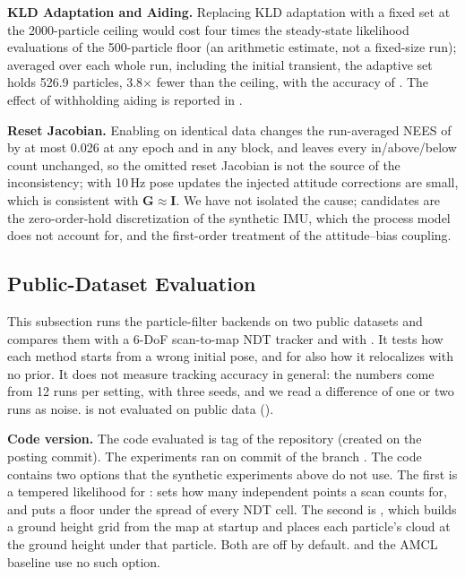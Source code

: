 \noindent\textbf{KLD Adaptation and Aiding.} Replacing KLD adaptation with a fixed set at the 2000-particle ceiling would cost four times the steady-state likelihood evaluations of the 500-particle floor (an arithmetic estimate, not a fixed-size run); averaged over each whole run, including the initial transient, the adaptive set holds 526.9 particles, 3.8$\times$ fewer than the ceiling, with the accuracy of . The effect of withholding aiding is reported in .

\noindent\textbf{Reset Jacobian.} Enabling  on identical data changes the run-averaged NEES of  by at most 0.026 at any epoch and in any block, and leaves every in/above/below count unchanged, so the omitted reset Jacobian is not the source of the inconsistency; with 10\,Hz pose updates the injected attitude corrections are small, which is consistent with $\mathbf{G}\approx\mathbf{I}$. We have not isolated the cause; candidates are the zero-order-hold discretization of the synthetic IMU, which the process model does not account for, and the first-order treatment of the attitude--bias coupling.

\subsection{Public-Dataset Evaluation}\label{sec:public}

This subsection runs the particle-filter backends on two public datasets and compares them with a 6-DoF scan-to-map NDT tracker and with . It tests how each method starts from a wrong initial pose, and for  also how it relocalizes with no prior. It does not measure tracking accuracy in general: the numbers come from 12 runs per setting, with three seeds, and we read a difference of one or two runs as noise.  is not evaluated on public data ().

\noindent\textbf{Code version.} The code evaluated is tag  of the repository (created on the posting commit). The experiments ran on commit  of the branch . The code contains two options that the synthetic experiments above do not use. The first is a tempered likelihood for :  sets how many independent points a scan counts for, and  puts a floor under the spread of every NDT cell. The second is , which builds a ground height grid from the map at startup and places each particle's cloud at the ground height under that particle. Both are off by default.  and the AMCL baseline use no such option.

